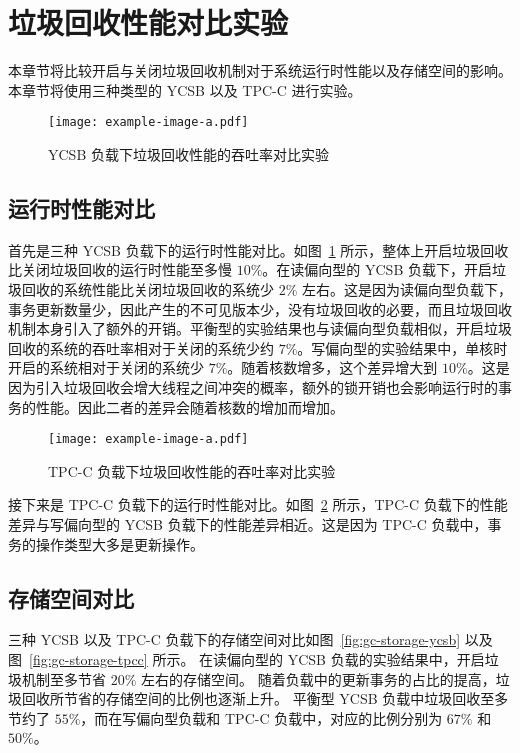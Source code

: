 \section{垃圾回收性能对比实验}

本章节将比较开启与关闭垃圾回收机制对于系统运行时性能以及存储空间的影响。本章节将使用三种类型的 YCSB 以及 TPC-C 进行实验。

\begin{figure}
    \centering
    \texttt{[image: example-image-a.pdf]}
    \caption{YCSB 负载下垃圾回收性能的吞吐率对比实验}
    \label{fig:gc-throughput-ycsb}
\end{figure}

\subsection{运行时性能对比}

首先是三种 YCSB 负载下的运行时性能对比。如图~\ref{fig:gc-throughput-ycsb} 所示，整体上开启垃圾回收比关闭垃圾回收的运行时性能至多慢 $10\%$。在读偏向型的 YCSB 负载下，开启垃圾回收的系统性能比关闭垃圾回收的系统少 $2\%$ 左右。这是因为读偏向型负载下，事务更新数量少，因此产生的不可见版本少，没有垃圾回收的必要，而且垃圾回收机制本身引入了额外的开销。平衡型的实验结果也与读偏向型负载相似，开启垃圾回收的系统的吞吐率相对于关闭的系统少约 $7\%$。写偏向型的实验结果中，单核时开启的系统相对于关闭的系统少 $7\%$。随着核数增多，这个差异增大到 $10\%$。这是因为引入垃圾回收会增大线程之间冲突的概率，额外的锁开销也会影响运行时的事务的性能。因此二者的差异会随着核数的增加而增加。


\begin{figure}
    \centering
    \texttt{[image: example-image-a.pdf]}
    \caption{TPC-C 负载下垃圾回收性能的吞吐率对比实验}
    \label{fig:gc-throughput-tpcc}
\end{figure}

接下来是 TPC-C 负载下的运行时性能对比。如图~\ref{fig:gc-throughput-tpcc} 所示，TPC-C 负载下的性能差异与写偏向型的 YCSB 负载下的性能差异相近。这是因为 TPC-C 负载中，事务的操作类型大多是更新操作。



\subsection{存储空间对比}

三种 YCSB 以及 TPC-C 负载下的存储空间对比如图~\ref{fig:gc-storage-ycsb} 以及图~\ref{fig:gc-storage-tpcc} 所示。
在读偏向型的 YCSB 负载的实验结果中，开启垃圾机制至多节省 $20\%$ 左右的存储空间。
随着负载中的更新事务的占比的提高，垃圾回收所节省的存储空间的比例也逐渐上升。
平衡型 YCSB 负载中垃圾回收至多节约了 $55\%$，而在写偏向型负载和 TPC-C 负载中，对应的比例分别为 $67\%$ 和 $50\%$。

